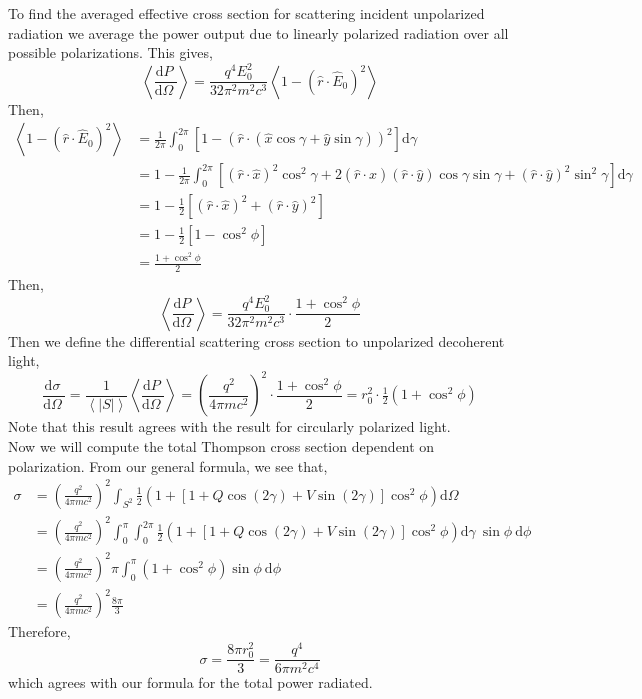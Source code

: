 \documentclass[12pt]{extarticle}
\renewcommand{\d}[1]{ \mathrm{d}#1 \:}
\newcommand{\deriv}[2]{\frac{\d{#1}}{\d{#2}}}
\theoremstyle{definition}
\begin{document}
To find the averaged effective cross section for scattering incident unpolarized radiation we average the power output due to linearly polarized radiation over all possible polarizations. This gives,
\[ \left< \deriv{P}{\Omega} \right> = \frac{q^4 E_0^2}{32 \pi^2 m^2 c^3} \left<  1 - (\hat{r} \cdot \hat{E}_0)^2 \right>  \]
Then,
\begin{align*}
\left<  1 - (\hat{r} \cdot \hat{E}_0)^2 \right> & = \frac{1}{2 \pi} \int_0^{2 \pi} \left[1 - (\hat{r} \cdot (\hat{x} \cos{\gamma} + \hat{y} \sin{\gamma}))^2 \right] \d{\gamma}
\\
& = 1 - \frac{1}{2 \pi} \int_0^{2\pi} [(\hat{r} \cdot \hat{x})^2 \cos^2{\gamma} + 2 (\hat{r} \cdot \hat{x})(\hat{r} \cdot \hat{y}) \cos{\gamma} \sin{\gamma} + (\hat{r} \cdot \hat{y})^2 \sin^2{\gamma} ] \d{\gamma}
\\
& = 1 - \frac{1}{2} [(\hat{r} \cdot \hat{x})^2 + (\hat{r} \cdot \hat{y})^2 ] 
\\
& = 1 - \frac{1}{2} [1 - \cos^2{\phi} ]
\\
& = \frac{1 + \cos^2{\phi}}{2}
\end{align*}
Then,
\[ \left< \deriv{P}{\Omega} \right> = \frac{q^4 E_0^2}{32 \pi^2 m^2 c^3} \cdot \frac{1 + \cos^2{\phi}}{2} \]
Then we define the differential scattering cross section to unpolarized decoherent light,
\[ \deriv{\sigma}{\Omega} = \frac{1}{\left< | S | \right>} \left< \deriv{P}{\Omega} \right> = \left( \frac{q^2}{4 \pi m c^2} \right)^2 \cdot \frac{1 + \cos^2{\phi}}{2} = r_0^2 \cdot \tfrac{1}{2}  (1 + \cos^2{\phi}) \]
Note that this result agrees with the result for circularly polarized light. 
\bigskip\\
Now we will compute the total Thompson cross section dependent on polarization. From our general formula, we see that,
\begin{align*}
\sigma & = \left( \frac{q^2}{4 \pi m c^2} \right)^2  \int_{S^2} \tfrac{1}{2} \left(1 + \left[ 1 + Q \cos{(2 \gamma)} + V \sin{(2 \gamma)} \right] \cos^2{\phi} \right) \d{\Omega}
\\
& = \left( \frac{q^2}{4 \pi m c^2} \right)^2  \int_0^\pi \int_0^{2 \pi} \tfrac{1}{2} \left(1 + \left[ 1 + Q \cos{(2 \gamma)} + V \sin{(2 \gamma)} \right] \cos^2{\phi} \right) \d{\gamma} \sin{\phi} \: \d{\phi}
\\
& = \left( \frac{q^2}{4 \pi m c^2} \right)^2 \pi \int_0^\pi (1 + \cos^2{\phi}) \sin{\phi} \: \d{\phi}
\\
& = \left( \frac{q^2}{4 \pi m c^2} \right)^2 \frac{8 \pi}{3}
\end{align*}
Therefore,
\[ \sigma = \frac{8 \pi r_0^2}{3} = \frac{q^4}{6 \pi m^2 c^4}   \]
which agrees with our formula for the total power radiated.
\end{document}
